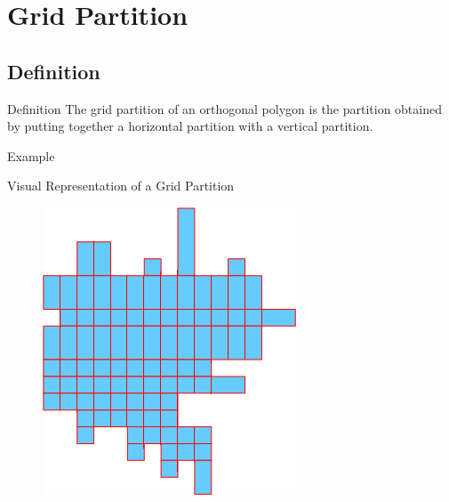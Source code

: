 \documentclass{beamer}
\begin{document}
\section{Grid Partition}
\subsection{Definition}
\begin{frame}
\begin{block}{Definition}
	The grid partition of an orthogonal polygon is the partition obtained by putting together a horizontal partition with a vertical partition.
\end{block}
\end{frame}

\begin{frame}{Example}
\begin{block}{Visual Representation of a Grid Partition}
	\begin{figure}
		\includegraphics[scale=0.5]{images/gridPartition}
	\end{figure}
\end{block}
\end{frame}
\end{document}
